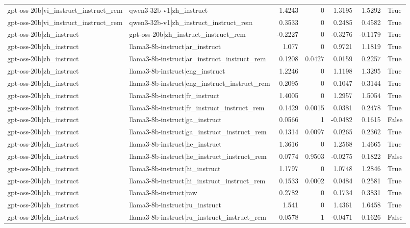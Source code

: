 \begin{table}
\begin{tabular}{l l r r r r l}
gpt-oss-20b|vi_instruct_instruct_rem & qwen3-32b-v1|zh_instruct & 1.4243 & 0 & 1.3195 & 1.5292 & True \\
gpt-oss-20b|vi_instruct_instruct_rem & qwen3-32b-v1|zh_instruct_instruct_rem & 0.3533 & 0 & 0.2485 & 0.4582 & True \\
gpt-oss-20b|zh_instruct & gpt-oss-20b|zh_instruct_instruct_rem & -0.2227 & 0 & -0.3276 & -0.1179 & True \\
gpt-oss-20b|zh_instruct & llama3-8b-instruct|ar_instruct & 1.077 & 0 & 0.9721 & 1.1819 & True \\
gpt-oss-20b|zh_instruct & llama3-8b-instruct|ar_instruct_instruct_rem & 0.1208 & 0.0427 & 0.0159 & 0.2257 & True \\
gpt-oss-20b|zh_instruct & llama3-8b-instruct|eng_instruct & 1.2246 & 0 & 1.1198 & 1.3295 & True \\
gpt-oss-20b|zh_instruct & llama3-8b-instruct|eng_instruct_instruct_rem & 0.2095 & 0 & 0.1047 & 0.3144 & True \\
gpt-oss-20b|zh_instruct & llama3-8b-instruct|fr_instruct & 1.4005 & 0 & 1.2957 & 1.5054 & True \\
gpt-oss-20b|zh_instruct & llama3-8b-instruct|fr_instruct_instruct_rem & 0.1429 & 0.0015 & 0.0381 & 0.2478 & True \\
gpt-oss-20b|zh_instruct & llama3-8b-instruct|ga_instruct & 0.0566 & 1 & -0.0482 & 0.1615 & False \\
gpt-oss-20b|zh_instruct & llama3-8b-instruct|ga_instruct_instruct_rem & 0.1314 & 0.0097 & 0.0265 & 0.2362 & True \\
gpt-oss-20b|zh_instruct & llama3-8b-instruct|he_instruct & 1.3616 & 0 & 1.2568 & 1.4665 & True \\
gpt-oss-20b|zh_instruct & llama3-8b-instruct|he_instruct_instruct_rem & 0.0774 & 0.9503 & -0.0275 & 0.1822 & False \\
gpt-oss-20b|zh_instruct & llama3-8b-instruct|hi_instruct & 1.1797 & 0 & 1.0748 & 1.2846 & True \\
gpt-oss-20b|zh_instruct & llama3-8b-instruct|hi_instruct_instruct_rem & 0.1533 & 0.0002 & 0.0484 & 0.2581 & True \\
gpt-oss-20b|zh_instruct & llama3-8b-instruct|raw & 0.2782 & 0 & 0.1734 & 0.3831 & True \\
gpt-oss-20b|zh_instruct & llama3-8b-instruct|ru_instruct & 1.541 & 0 & 1.4361 & 1.6458 & True \\
gpt-oss-20b|zh_instruct & llama3-8b-instruct|ru_instruct_instruct_rem & 0.0578 & 1 & -0.0471 & 0.1626 & False \\

\end{tabular}
\end{table}
